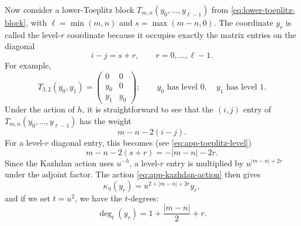 \documentclass[12pt,a4paper]{article}
\begin{document}
Now consider a lower-Toeplitz block
$T_{m,n}(y_0,\ldots,y_{\ell-1})$ from
\eqref{eq:lower-toeplitz-block}, with
$\ell=\min(m,n)$ and $s=\max(m-n,0)$.  The coordinate $y_r$ is called the
level-$r$ coordinate because it occupies exactly the matrix entries on the
diagonal
\begin{equation}
 i-j=s+r,\qquad r=0,\ldots,\ell-1.
 \label{eq:app-toeplitz-level}
\end{equation}
For example,
\begin{equation}
 T_{3,2}(y_0,y_1)=
 \begin{pmatrix}0&0\\y_0&0\\y_1&y_0\end{pmatrix};
 \qquad y_0\text{ has level }0,\quad y_1\text{ has level }1.
 \label{eq:app-toeplitz-example}
\end{equation}
Under the action of $h$, it is straightforward to see that the $(i,j)$ entry of $T_{m,n}(y_0,\ldots,y_{\ell-1})$ has the weight
\begin{equation}
 m-n-2(i-j).
 \label{eq:app-matrix-unit-weight}
\end{equation}
For a level-$r$ diagonal entry, this becomes (see \eqref{eq:app-toeplitz-level})
\begin{equation}
 m-n-2(s+r)=-|m-n|-2r.
 \label{eq:app-toeplitz-h-weight}
\end{equation}
Since the Kazhdan action uses $u^{-h}$, a level-$r$ entry is multiplied by
$u^{|m-n|+2r}$ under the adjoint factor. The action 
\eqref{eq:app-kazhdan-action} then gives
\begin{equation}
 \kappa_u(y_r)=u^{2+|m-n|+2r}y_r,
 \label{eq:app-toeplitz-fugacity}
\end{equation}
and if we set $t=u^2$, we have the $t$-degrees:
\begin{equation}
 \deg_t(y_r)=1+\frac{|m-n|}{2}+r.
 \label{eq:Kazhdan-t-degree}
\end{equation}

\medskip
\end{document}
